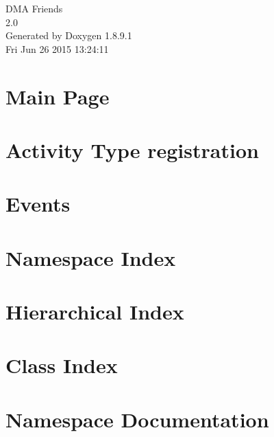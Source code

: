 \documentclass[twoside]{book}
\newcommand{\+}{\discretionary{\mbox{\scriptsize$\hookleftarrow$}}{}{}}
\newcommand{\clearemptydoublepage}{%
  \newpage{\pagestyle{empty}\cleardoublepage}%
}
\begin{document}
\hypersetup{pageanchor=false,
             bookmarks=true,
             bookmarksnumbered=true,
             pdfencoding=unicode
            }
\begin{titlepage}
\vspace*{7cm}
\begin{center}%
{\Large D\+M\+A Friends \\[1ex]\large 2.\+0 }\\
\vspace*{1cm}
{\large Generated by Doxygen 1.8.9.1}\\
\vspace*{0.5cm}
{\small Fri Jun 26 2015 13:24:11}\\
\end{center}
\end{titlepage}
\clearemptydoublepage
\tableofcontents
\clearemptydoublepage
{}
\hypersetup{pageanchor=true}

\chapter{Main Page}
\label{index}\hypertarget{index}{}
\chapter{Activity Type registration}
\label{df/d06/md_docs_ACTIVITY-TYPES}
\hypertarget{df/d06/md_docs_ACTIVITY-TYPES}{}

\chapter{Events}
\label{df/d0e/md_docs_EVENTS}
\hypertarget{df/d0e/md_docs_EVENTS}{}

\chapter{Namespace Index}

\chapter{Hierarchical Index}

\chapter{Class Index}

\chapter{Namespace Documentation}




\end{document}
